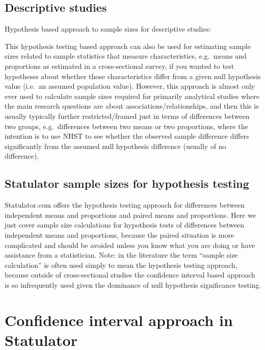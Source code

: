 \documentclass[
]{book}
\begin{document}
\hypertarget{descriptive-studies}{%
\subsection{Descriptive studies}\label{descriptive-studies}}

Hypothesis based approach to sample sizes for descriptive studies:

This hypothesis testing based approach can also be used for estimating sample sizes related to sample statistics that measure characteristics, e.g.~means and proportions as estimated in a cross-sectional survey, if you wanted to test hypotheses about whether those characteristics differ from a given null hypothesis value (i.e.~an assumed population value). However, this approach is almost only ever used to calculate sample sizes required for primarily analytical studies where the main research questions are about associations/relationships, and then this is usually typically further restricted/framed just in terms of differences between two groups, e.g.~differences between two means or two proportions, where the intention is to use NHST to see whether the observed sample difference differs significantly from the assumed null hypothesis difference (usually of no difference).

\hypertarget{statulator-sample-sizes-for-hypothesis-testing}{%
\subsection{Statulator sample sizes for hypothesis testing}\label{statulator-sample-sizes-for-hypothesis-testing}}

Statulator.com offers the hypothesis testing approach for differences between independent means and proportions and paired means and proportions. Here we just cover sample size calculations for hypothesis tests of differences between independent means and proportions, because the paired situation is more complicated and should be avoided unless you know what you are doing or have assistance from a statistician. Note: in the literature the term ``sample size calculation'' is often used simply to mean the hypothesis testing approach, because outside of cross-sectional studies the confidence interval based approach is so infrequently used given the dominance of null hypothesis significance testing.

\hypertarget{confidence-interval-approach-in-statulator}{%
\section{Confidence interval approach in Statulator}\label{confidence-interval-approach-in-statulator}}
\end{document}
